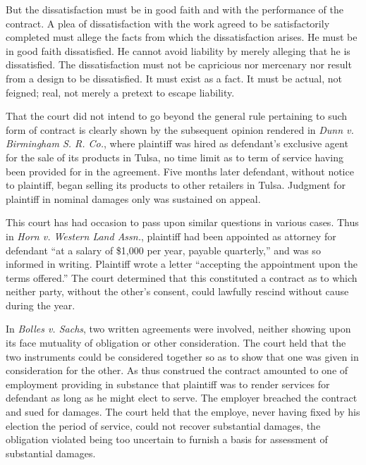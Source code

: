 \documentclass[
  letterpaper,
  11pt,
  DIV=9,
  openright]{scrbook}
\renewenvironment{quote}{
  \list{}{\leftmargin=2em\rightmargin=2em}
  \item\relax\small
}
{\endlist}
\begin{document}
\begin{quote}
But the dissatisfaction must be in good faith and with the performance
of the contract. A plea of dissatisfaction with the work agreed to be
satisfactorily completed must allege the facts from which the
dissatisfaction arises. He must be in good faith dissatisfied. He cannot
avoid liability by merely alleging that he is dissatisfied. The
dissatisfaction must not be capricious nor mercenary nor result from a
design to be dissatisfied. It must exist as a fact. It must be actual,
not feigned; real, not merely a pretext to escape liability.
\end{quote}

That the court did not intend to go beyond the general rule pertaining
to such form of contract is clearly shown by the subsequent opinion
rendered in \emph{Dunn v. Birmingham S. R. Co.}, where plaintiff was
hired as defendant's exclusive agent for the sale of its products in
Tulsa, no time limit as to term of service having been provided for in
the agreement. Five months later defendant, without notice to plaintiff,
began selling its products to other retailers in Tulsa. Judgment for
plaintiff in nominal damages only was sustained on appeal.

This court has had occasion to pass upon similar questions in various
cases. Thus in \emph{Horn v. Western Land Assn.}, plaintiff had been
appointed as attorney for defendant ``at a salary of \$1,000 per year,
payable quarterly,'' and was so informed in writing. Plaintiff wrote a
letter ``accepting the appointment upon the terms offered.'' The court
determined that this constituted a contract as to which neither party,
without the other's consent, could lawfully rescind without cause during
the year.

In \emph{Bolles v. Sachs}, two written agreements were involved, neither
showing upon its face mutuality of obligation or other consideration.
The court held that the two instruments could be considered together so
as to show that one was given in consideration for the other. As thus
construed the contract amounted to one of employment providing in
substance that plaintiff was to render services for defendant as long as
he might elect to serve. The employer breached the contract and sued for
damages. The court held that the employe, never having fixed by his
election the period of service, could not recover substantial damages,
the obligation violated being too uncertain to furnish a basis for
assessment of substantial damages.
\end{document}
